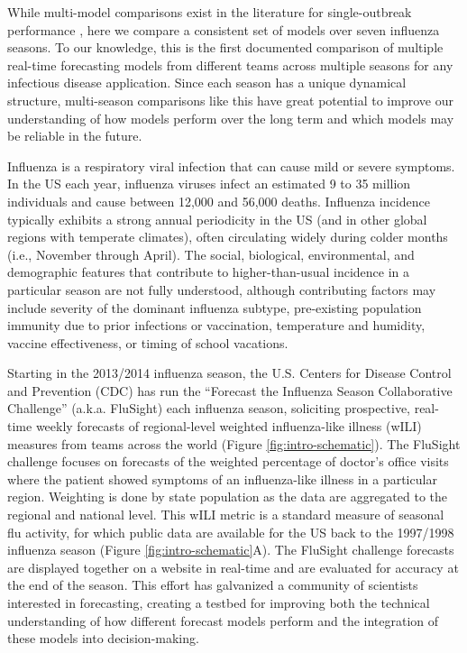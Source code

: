 \documentclass[9pt,twocolumn,twoside]{pnas-new}\usepackage[]{graphicx}\usepackage[]{color}
\begin{document}
While multi-model comparisons exist in the literature for single-outbreak performance \cite{Biggerstaff2016,Viboud2017,Biggerstaff2018}, here we compare a consistent set of models over seven influenza seasons. 
To our knowledge, this is the first documented comparison of multiple real-time forecasting models from different teams across multiple seasons for any infectious disease application.
Since each season has a unique dynamical structure, multi-season comparisons like this have great potential to improve our understanding of how models perform over the long term and which models may be reliable in the future.

Influenza is a respiratory viral infection that can cause mild or severe symptoms.
In the US each year, influenza viruses infect an estimated 9 to 35 million individuals and cause between 12,000 and 56,000 deaths.\cite{Rolfes2016}
Influenza incidence typically exhibits a strong annual periodicity in the US (and in other global regions with temperate climates), often circulating widely during colder months (i.e., November through April). 
The social, biological, environmental, and demographic features that contribute to higher-than-usual incidence in a particular season are not fully understood, although contributing factors may include severity of the dominant influenza subtype\cite{thompson2003}, pre-existing population immunity due to prior infections or vaccination\cite{Woolthuis2017,Zarnitsyna2018}, temperature and humidity\cite{lowen2007}, vaccine effectiveness\cite{Rolfes2016}, or timing of school vacations\cite{cauchemez2008}.

Starting in the 2013/2014 influenza season, the U.S. Centers for Disease Control and Prevention (CDC) has run the ``Forecast the Influenza Season Collaborative Challenge'' (a.k.a. FluSight) each influenza season, soliciting prospective, real-time weekly forecasts of regional-level weighted influenza-like illness (wILI) measures from teams across the world (Figure \ref{fig:intro-schematic}).\cite{Biggerstaff2016,Biggerstaff2018}
The FluSight challenge focuses on forecasts of the weighted percentage of doctor's office visits where the patient showed symptoms of an influenza-like illness in a particular region. Weighting is done by state population as the data are aggregated to the regional and national level.
This wILI metric is a standard measure of seasonal flu activity, for which public data are available for the US back to the 1997/1998 influenza season (Figure \ref{fig:intro-schematic}A). 
The FluSight challenge forecasts are displayed together on a website in real-time and are evaluated for accuracy at the end of the season.\cite{PhiResearchLab} 
This effort has galvanized a community of scientists interested in forecasting, creating a testbed for improving both the technical understanding of how different forecast models perform and the integration of these models into decision-making.
\end{document}
